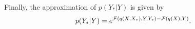 %
Finally, the approximation 
of $p(Y_* |Y)$ is given by 
\begin{equation}
p(Y_* |Y) = e^{ \mathcal{F}(q(X,X_*),Y,Y_*) - \mathcal{F}(q(X),Y)  }. 
\label{eq:predictive1}
\end{equation}





